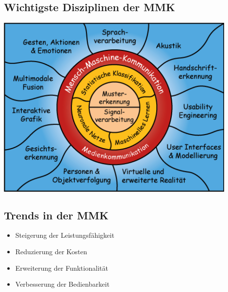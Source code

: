 \documentclass[german,color,6pt]{latex4ei/latex4ei_sheet}
\begin{document}
\begin{sectionbox}
	\subsection{Wichtigste Disziplinen der MMK}
	\begin{center}
		\includegraphics[width=0.9\textwidth]{mmk_diziplinen}
	\end{center}
\end{sectionbox}
\begin{sectionbox}
	\subsection{Trends in der MMK}
	\begin{itemize}
		\item Steigerung der Leistungsfähigkeit
		\item Reduzierung der Kosten
		\item Erweiterung der Funktionalität
		\item Verbesserung der Bedienbarkeit
	\end{itemize}
\end{sectionbox}
\end{document}
